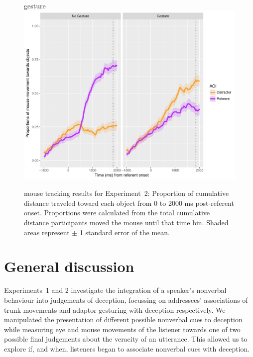 \documentclass[a4paper,man,natbib]{apa6}
\begin{document}
\begin{figure}[Ht]gesture
  \centering
	\includegraphics[width=\linewidth]{./img/e8_mouset.pdf}
  \caption{mouse tracking results for Experiment~2: Proportion of cumulative distance traveled toward each object from 0 to 2000 ms post-referent onset. Proportions were calculated from the total cumulative distance participants moved the mouse until that time bin. Shaded areas represent $\pm$ 1 standard error of the mean.}
  \label{fig:v2_mouse}
\end{figure}

\section{General discussion}

Experiments~1 and 2 investigate the integration of a speaker's nonverbal behaviour into judgements of deception, focussing on addressees' associations of trunk movements and adaptor gesturing with deception respectively.
We manipulated the presentation of different possible nonverbal cues to deception while measuring eye  and mouse  movements of the listener towards one of two possible final judgements about the veracity of an utterance.
This allowed us to explore if, and when, listeners began to associate nonverbal cues with deception.
\end{document}
